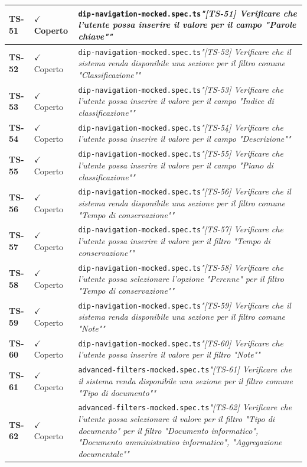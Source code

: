 \documentclass[a4paper,12pt]{article}
\newcommand{\ok}{\textcolor{green!60!black}{$\checkmark$ Coperto}}
\newcommand{\f}[1]{\nolinkurl{#1}\newline}
\newcommand{\q}[1]{\textit{#1}}
\begin{document}
\begin{longtable}{|p{1.5cm}|p{3.0cm}|p{10.5cm}|}
\textbf{TS-51} & \ok & \f{dip-navigation-mocked.spec.ts}\q{"[TS-51] Verificare che l'utente possa inserire il valore per il campo "Parole chiave""} \\ \hline
\textbf{TS-52} & \ok & \f{dip-navigation-mocked.spec.ts}\q{"[TS-52] Verificare che il sistema renda disponibile una sezione per il filtro comune "Classificazione""} \\ \hline
\textbf{TS-53} & \ok & \f{dip-navigation-mocked.spec.ts}\q{"[TS-53] Verificare che l'utente possa inserire il valore per il campo "Indice di classificazione""} \\ \hline
\textbf{TS-54} & \ok & \f{dip-navigation-mocked.spec.ts}\q{"[TS-54] Verificare che l'utente possa inserire il valore per il campo "Descrizione""} \\ \hline
\textbf{TS-55} & \ok & \f{dip-navigation-mocked.spec.ts}\q{"[TS-55] Verificare che l'utente possa inserire il valore per il campo "Piano di classificazione""} \\ \hline
\textbf{TS-56} & \ok & \f{dip-navigation-mocked.spec.ts}\q{"[TS-56] Verificare che il sistema renda disponibile una sezione per il filtro comune "Tempo di conservazione""} \\ \hline
\textbf{TS-57} & \ok & \f{dip-navigation-mocked.spec.ts}\q{"[TS-57] Verificare che l'utente possa inserire il valore per il filtro "Tempo di conservazione""} \\ \hline
\textbf{TS-58} & \ok & \f{dip-navigation-mocked.spec.ts}\q{"[TS-58] Verificare che l'utente possa selezionare l'opzione "Perenne" per il filtro "Tempo di conservazione""} \\ \hline
\textbf{TS-59} & \ok & \f{dip-navigation-mocked.spec.ts}\q{"[TS-59] Verificare che il sistema renda disponibile una sezione per il filtro comune "Note""} \\ \hline
\textbf{TS-60} & \ok & \f{dip-navigation-mocked.spec.ts}\q{"[TS-60] Verificare che l'utente possa inserire il valore per il filtro "Note""} \\ \hline
\textbf{TS-61} & \ok & \f{advanced-filters-mocked.spec.ts}\q{"[TS-61] Verificare che il sistema renda disponibile una sezione per il filtro comune "Tipo di documento""} \\ \hline
\textbf{TS-62} & \ok & \f{advanced-filters-mocked.spec.ts}\q{"[TS-62] Verificare che l'utente possa selezionare il valore per il filtro "Tipo di documento" per il filtro "Documento informatico", "Documento amministrativo informatico", "Aggregazione documentale""} \\ \hline

\end{longtable}
\end{document}
